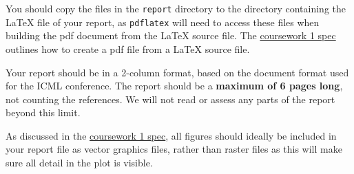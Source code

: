 \documentclass[11pt,]{article}
\def\pagelimit{6\xspace}
\begin{document}
You should copy the files in the \verb+report+ directory to the directory containing the LaTeX file of your report, as \verb+pdflatex+ will need to access these files when building the pdf document from the LaTeX source file. The  \href{https://github.com/VICO-UoE/mlpractical/blob/mlp2020-21/coursework_1/spec/mlp_cw1_2020_21.pdf}{coursework 1 spec} outlines how to create a pdf file from a LaTeX source file.

Your report should be in a 2-column format, based on the document format used for the ICML conference. The report should be a \textbf{maximum of \pagelimit pages long}, not counting the references.  We will not read or assess any parts of the report beyond this limit.

As discussed in the \href{https://github.com/VICO-UoE/mlpractical/blob/mlp2020-21/coursework_1/spec/mlp_cw1_2020_21.pdf}{coursework 1 spec},  all figures should ideally be included in your report file as vector graphics files, rather than raster files as this will make sure all detail in the plot is visible.

\end{document}
